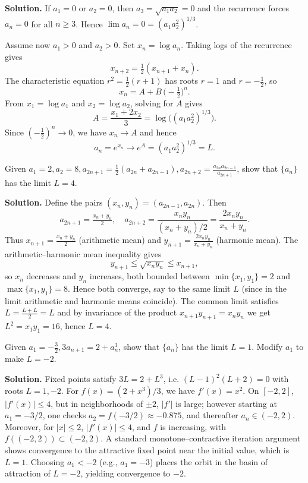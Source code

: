 \noindent\textbf{Solution.}
If \(a_1=0\) or \(a_2=0\), then \(a_3=\sqrt{a_1 a_2}=0\) and the recurrence forces \(a_n=0\) for all \(n\ge 3\). Hence \(\lim a_n=0=(a_1 a_2^2)^{1/3}\).

Assume now \(a_1>0\) and \(a_2>0\). Set \(x_n=\log a_n\). Taking logs of the recurrence gives
\[x_{n+2}=\tfrac{1}{2}(x_{n+1}+x_n).\]
The characteristic equation \(r^2=\tfrac{1}{2}(r+1)\) has roots \(r=1\) and \(r=-\tfrac{1}{2}\), so
\[x_n=A+B\,\big(-\tfrac{1}{2}\big)^{n}.\]
From \(x_1=\log a_1\) and \(x_2=\log a_2\), solving for \(A\) gives
\[A=\frac{x_1+2x_2}{3}=\log\big((a_1 a_2^2)^{1/3}\big).\]
Since \(({-}\tfrac{1}{2})^{n}\to 0\), we have \(x_n\to A\) and hence
\[a_n=e^{x_n}\longrightarrow e^{A}=(a_1 a_2^2)^{1/3}=L.\]

\begin{problembox}
Given \(a_1 = 2, a_2 = 8, a_{2n+1} = \frac{1}{2}(a_{2n} + a_{2n-1}), a_{2n+2} = \frac{a_{2n} a_{2n-1}}{a_{2n+1}}\), show that \(\{a_n\}\) has the limit \(L = 4\).
\end{problembox}

\noindent\textbf{Solution.}
Define the pairs \((x_n,y_n)=(a_{2n-1},a_{2n})\). Then
\[a_{2n+1}=\tfrac{x_n+y_n}{2},\quad a_{2n+2}=\frac{x_n y_n}{(x_n+y_n)/2}=\frac{2x_n y_n}{x_n+y_n}.\]
Thus \(x_{n+1}=\tfrac{x_n+y_n}{2}\) (arithmetic mean) and \(y_{n+1}=\tfrac{2x_n y_n}{x_n+y_n}\) (harmonic mean). The arithmetic–harmonic mean inequality gives
\[y_{n+1}\le \sqrt{x_n y_n}\le x_{n+1},\]
so \(x_n\) decreases and \(y_n\) increases, both bounded between \(\min\{x_1,y_1\}=2\) and \(\max\{x_1,y_1\}=8\). Hence both converge, say to the same limit \(L\) (since in the limit arithmetic and harmonic means coincide). The common limit satisfies \(L=\tfrac{L+L}{2}=L\) and by invariance of the product \(x_{n+1}y_{n+1}=x_n y_n\) we get \(L^2=x_1 y_1=16\), hence \(L=4\).

\begin{problembox}
Given \(a_1 = -\frac{3}{2}, 3a_{n+1} = 2 + a_n^3\), show that \(\{a_n\}\) has the limit \(L = 1\). Modify \(a_1\) to make \(L = -2\).
\end{problembox}

\noindent\textbf{Solution.}
Fixed points satisfy \(3L=2+L^3\), i.e. \((L-1)^2(L+2)=0\) with roots \(L=1,-2\). For \(f(x)=(2+x^3)/3\), we have \(f'(x)=x^2\). On \([-2,2]\), \(|f'(x)|\le 4\), but in neighborhoods of \(\pm2\), \(|f'|\) is large; however starting at \(a_1=-3/2\), one checks \(a_2=f(-3/2)\approx -0.875\), and thereafter \(a_n\in(-2,2)\). Moreover, for \(|x|\le 2\), \(|f'(x)|\le 4\), and \(f\) is increasing, with \(f((-2,2))\subset (-2,2)\). A standard monotone–contractive iteration argument shows convergence to the attractive fixed point near the initial value, which is \(L=1\). Choosing \(a_1<-2\) (e.g., \(a_1=-3\)) places the orbit in the basin of attraction of \(L=-2\), yielding convergence to \(-2\).

